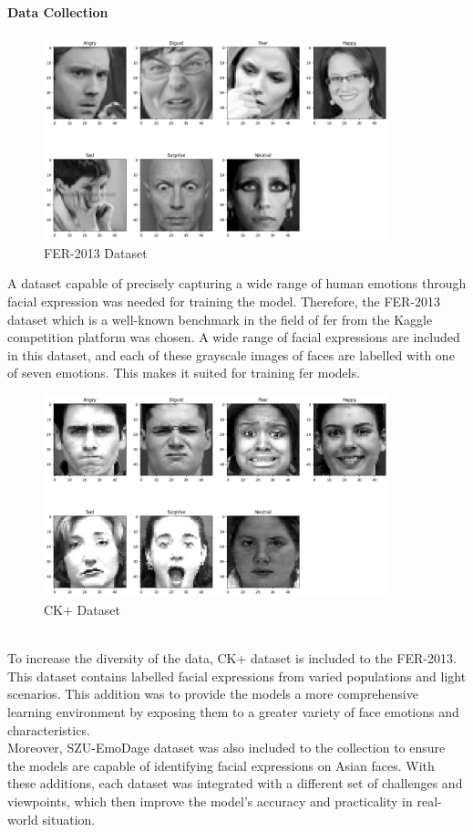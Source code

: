 \paragraph{Data Collection}
\begin{figure}[h!]
    \centering
    \includegraphics[width=10cm]{Images/fer2013.png}
    \caption{FER-2013 Dataset}
    \label{fig:fer2013}
\end{figure}
A dataset capable of precisely capturing a wide range of human emotions through facial expression was needed for training the model. 
Therefore, the FER-2013 \citep{challenges_in_representation_learning_facial_expression_recognition_challenge} dataset which is a well-known benchmark in the field of  \gls{fer} from the Kaggle competition platform was chosen.
A wide range of facial expressions are included in this dataset, and each of these grayscale images of faces are labelled with one of seven emotions.
This makes it suited for training \gls{fer} models.
\begin{figure}[h!]
    \centering
    \includegraphics[width=10cm]{Images/ckextended.png}
    \caption{CK+ Dataset}
    \label{fig:fer2013}
\end{figure}
\\
\indent To increase the diversity of the data, CK+ \citep{5543262} dataset is included to the FER-2013. 
This dataset contains labelled facial expressions from varied populations and light scenarios.
This addition was to provide the models a more comprehensive learning environment by exposing them to a greater variety of face emotions and characteristics.
\\
\indent Moreover, SZU-EmoDage \citep{who_2022_a} dataset was also included to the collection to ensure the models are capable of identifying facial expressions on Asian faces.
With these additions, each dataset was integrated with a different set of challenges and viewpoints, which then improve the model's accuracy and practicality in real-world situation.
